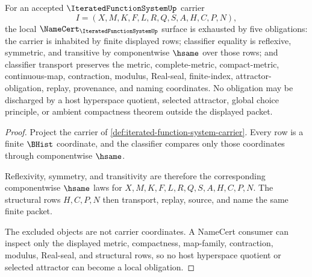 \begin{theorem}
\label{thm:iterated-function-system-namecert-obligations}
For an accepted $\IteratedFunctionSystemUp$ carrier
$$
I=(X,M,K,F,L,R,Q,S,A,H,C,P,N),
$$
the local $\NameCert_{\IteratedFunctionSystemUp}$ surface is exhausted by five obligations: the carrier is inhabited by finite displayed rows; classifier equality is reflexive, symmetric, and transitive by componentwise $\hsame$ over those rows; and classifier transport preserves the metric, complete-metric, compact-metric, continuous-map, contraction, modulus, Real-seal, finite-index, attractor-obligation, replay, provenance, and naming coordinates. No obligation may be discharged by a host hyperspace quotient, selected attractor, global choice principle, or ambient compactness theorem outside the displayed packet.
\end{theorem}
\begin{proof}
Project the carrier of \autoref{def:iterated-function-system-carrier}. Every row is a finite $\BHist$ coordinate, and the classifier compares only those coordinates through componentwise $\hsame$.

Reflexivity, symmetry, and transitivity are therefore the corresponding componentwise $\hsame$ laws for $X,M,K,F,L,R,Q,S,A,H,C,P,N$. The structural rows $H,C,P,N$ then transport, replay, source, and name the same finite packet.

The excluded objects are not carrier coordinates. A NameCert consumer can inspect only the displayed metric, compactness, map-family, contraction, modulus, Real-seal, and structural rows, so no host hyperspace quotient or selected attractor can become a local obligation.
\end{proof}

